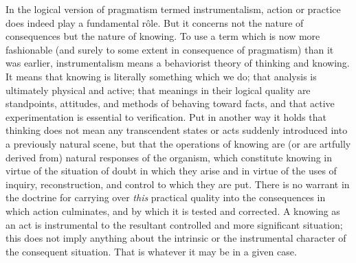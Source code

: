 \documentclass[12pt]{article}
\begin{document}
In the logical version of pragmatism termed instrumentalism,
action or practice does indeed play a
fundamental r\^{o}le. But it concerns not the nature
of consequences but the nature of knowing. To use
a term which is now more fashionable (and surely to
some extent in consequence of pragmatism) than it
was earlier, instrumentalism means a behaviorist
theory of thinking and knowing. It means that
knowing is literally something which we do; that
analysis is ultimately physical and active; that meanings
in their logical quality are standpoints, attitudes,
and methods of behaving toward facts, and that
active experimentation is essential to verification.
Put in another way it holds that thinking does not
mean any transcendent states or acts suddenly
introduced into a previously natural scene, but that
the operations of knowing are (or are artfully derived
from) natural responses of the organism, which constitute
knowing in virtue of the situation of doubt
in which they arise and in virtue of the uses of
inquiry, reconstruction, and control to which they are
put. There is no warrant in the doctrine for carrying
over \emph{this} practical quality into the consequences
in which action culminates, and by which it is tested
and corrected. A knowing as an act is instrumental
to the resultant controlled and more significant situation;
this does not imply anything about the intrinsic
or the instrumental character of the consequent
situation. That is whatever it may be in a given case.
\end{document}
